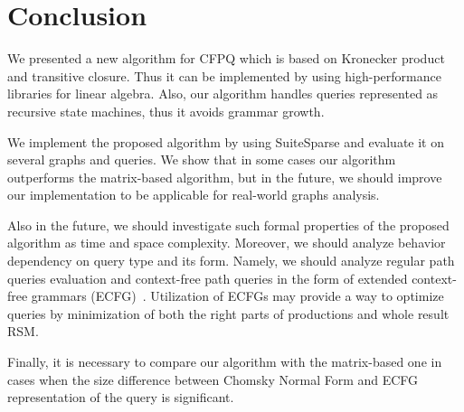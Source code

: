 \section{Conclusion}

We presented a new algorithm for CFPQ which is based on Kronecker product and transitive closure.
Thus it can be implemented by using high-performance libraries for linear algebra. Also, our algorithm handles queries represented as recursive state machines, thus it avoids grammar growth.

We implement the proposed algorithm by using SuiteSparse and evaluate it on several graphs and queries.
We show that in some cases our algorithm outperforms the matrix-based algorithm, but in the future, we should improve our implementation to be applicable for real-world graphs analysis. 

Also in the future, we should investigate such formal properties of the proposed algorithm as time and space complexity.
Moreover, we should analyze behavior dependency on query type and its form. Namely, we should analyze regular path queries evaluation and context-free path queries in the form of extended context-free grammars (ECFG)~\cite{10.1007/978-3-642-00982-2_35}.
Utilization of ECFGs may provide a way to optimize queries by minimization of both the right parts of productions and whole result RSM.

Finally, it is necessary to compare our algorithm with the matrix-based one in cases when the size difference between Chomsky Normal Form and ECFG representation of the query is significant.